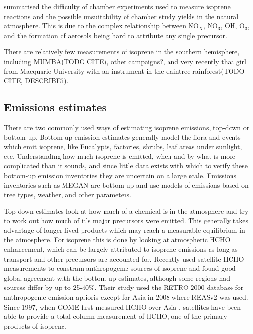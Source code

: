     
    \cite{Kanakidou2005} summarised the difficulty of chamber experiments used to measure isoprene reactions and the possible unsuitability of chamber study yields in the natural atmosphere.
    This is due to the complex relationship between NO$_X$, NO$_3$, OH, O$_3$, and the formation of aerosols being hard to attribute any single precursor.
    
    
    
    There are relatively few measurements of isoprene in the southern hemisphere, including MUMBA(TODO CITE), other campaigns?, and very recently that girl from Macquarie University with an instrument in the daintree rainforest(TODO CITE, DESCRIBE?).
    
  
  
  
  \subsection{Emissions estimates}
    \label{LR:O3andAQ:EmissinosEstimates}
    
    There are two commonly used ways of estimating isoprene emissions, top-down or bottom-up.
    Bottom-up emission estimates generally model the flora and events which emit isoprene, like Eucalypts, factories, shrubs, leaf areas under sunlight, etc.
    Understanding how much isoprene is emitted, when and by what is more complicated than it sounds, and since little data exists with which to verify these bottom-up emission inventories they are uncertain on a large scale.
    Emissions inventories such as MEGAN are bottom-up and use models of emissions based on tree types, weather, and other parameters.    
    
    Top-down estimates look at how much of a chemical is in the atmosphere and try to work out how much of it's major precursors were emitted.
    This generally takes advantage of longer lived products which may reach a measurable equilibrium in the atmosphere.
    For isoprene this is done by looking at atmospheric HCHO enhancement, which can be largely attributed to isoprene emissions as long as transport and other precursors are accounted for.
    Recently \cite{Stavrakou2015} used satellite HCHO measurements to constrain anthropogenic sources of isoprene and found good global agreement with the bottom up estimates, although some regions had sources differ by up to 25-40\%. 
    Their study used the RETRO 2000 database for anthropogenic emission aprioris except for Asia in 2008 where REASv2 was used. 
    Since 1997, when GOME first measured HCHO over Asia \citep{Thomas1998}, satellites have been able to provide a total column measurement of HCHO, one of the primary products of isoprene.
    
